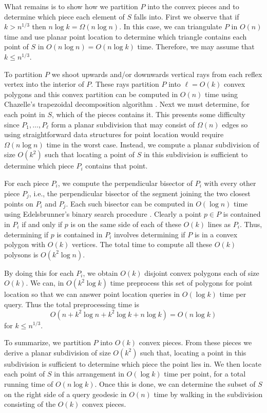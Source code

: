 \documentclass[charterfonts,lotsofwhite]{patmorin}
\begin{document}
What remains is to show how we partition $P$ into the convex pieces
and to determine which piece each element of $S$ falls into.  First we
observe that if $k>n^{1/3}$ then $n\log k=\Omega(n\log n)$.  In this
case, we can triangulate $P$ in $O(n)$ time and use planar point
location to determine which triangle contains each point of $S$ in
$O(n\log n)=O(n\log k)$ time.  Therefore, we may assume that $k\le
n^{1/3}$.

To partition $P$ we shoot upwards and/or downwards vertical rays from
each reflex vertex into the interior of $P$. These rays partition $P$
into $\ell=O(k)$ convex polygons and this convex partition can be
computed in $O(n)$ time using Chazelle's trapezoidal decomposition
algorithm \cite{c91}.  Next we must determine, for each point in $S$,
which of the pieces contains it.  This presents some difficulty since
$P_1,\ldots,P_\ell$ form a planar subdivision that may consist of
$\Omega(n)$ edges so using straightforward data structures for point
location would require $\Omega(n\log n)$ time in the worst case.
Instead, we compute a planar subdivision of size $O(k^2)$ such that
locating a point of $S$ in this subdivision is sufficient to determine
which piece $P_i$ contains that point.  

For each piece $P_i$, we compute the perpendicular bisector of $P_i$
with every other piece $P_j$, i.e., the perpendicular bisector of the
segment joining the two closest points on $P_i$ and $P_j$.  Each such
bisector can be computed in $O(\log n)$ time using Edelsbrunner's
binary search procedure \cite{e85}. Clearly a point $p\in P$ is
contained in $P_i$ if and only if $p$ is on the same side of each of
these $O(k)$ lines as $P_i$.  Thus, determining if $p$ is contained in
$P_i$ involves determining if $P$ is in a convex polygon with $O(k)$
vertices.  The total time to compute all these $O(k)$ polysons is
$O(k^2\log n)$. 

By doing this for each $P_i$, we obtain $O(k)$ disjoint convex
polygons each of size $O(k)$.  We can, in $O(k^2\log k)$ time
preprocess this set of polygons for point location so that we can
answer point location queries in $O(\log k)$ time per query.  Thus the
total preprocessing time is 
\[ O(n+k^2\log n+k^2\log k + n\log k)= O(n\log k) \]
for $k\le n^{1/3}$.

To summarize, we partition $P$ into $O(k)$ convex pieces.  From these
pieces we derive a planar subdivision of size $O(k^2)$ such that,
locating a point in this subdivision is sufficient to determine which
piece the point lies in.  We then locate each point of $S$ in this
arrangement in $O(\log k)$ time per point, for a total running time of
$O(n\log k)$.  Once this is done, we can determine the subset of $S$
on the right side of a query geodesic in $O(n)$ time by walking in the
subdivision consisting of the $O(k)$ convex pieces. 
\end{document}
